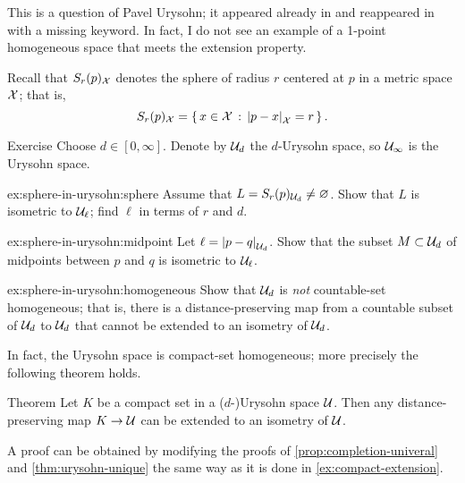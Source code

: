 This is a question of Pavel Urysohn; it appeared already in \cite[§$2(6)$]{urysohn} 
and reappeared in \cite[p. 83]{gromov-2007} with a missing keyword.
In fact, I do not see an example of a 1-point homogeneous space that meets the extension property.

Recall that $S_r(p)_{\mathcal{X}}$ denotes the sphere of radius $r$ centered at $p$ in a metric space $\mathcal{X}$;
that is, 
$$S_r(p)_{\spc{X}}=\set{x\in \spc{X}}{\dist{p}{x}{\spc{X}}=r}.$$

\begin{thm}{Exercise}\label{ex:sphere-in-urysohn}
Choose $d\in [0,\infty]$.
Denote by $\mathcal{U}_d$ the $d$-Urysohn space,
so $\mathcal{U}_\infty$ is the Urysohn space.

\begin{subthm}{ex:sphere-in-urysohn:sphere}
Assume that $L=S_r(p)_{\mathcal{U}_d}\ne \varnothing$.
Show that $L$ is isometric to $\mathcal{U}_{\ell}$; find $\ell$ in terms of $r$ and $d$.
\end{subthm}

\begin{subthm}{ex:sphere-in-urysohn:midpoint}
Let $\ell=\dist{p}{q}{\spc{U}_d}$.
Show that the subset $M\subset\mathcal{U}_d$ of midpoints between $p$ and $q$ is isometric to $\mathcal{U}_\ell$.
\end{subthm}

\begin{subthm}{ex:sphere-in-urysohn:homogeneous}
Show that $\mathcal{U}_d$ is \emph{not} countable-set homogeneous;
that is, there is a distance-preserving map from a countable subset of $\mathcal{U}_d$ to $\mathcal{U}_d$ that cannot be extended to an isometry of $\mathcal{U}_d$.
\end{subthm}
\end{thm}

In fact, the Urysohn space is compact-set homogeneous; more precisely the following theorem holds.

\begin{thm}{Theorem}\label{thm:compact-homogeneous}
Let $K$ be a compact set in a ($d$-)Urysohn space $\mathcal{U}$.
Then any distance-preserving map $K\to \mathcal{U}$ can be extended to an isometry of $\mathcal{U}$.
\end{thm}

A proof can be obtained by modifying the proofs of \ref{prop:completion-univeral} and \ref{thm:urysohn-unique}
the same way as it is done in \ref{ex:compact-extension}.

